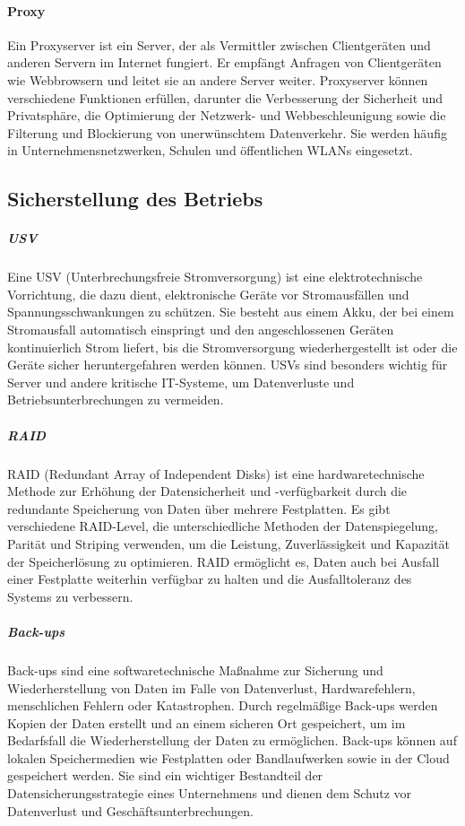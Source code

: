 \paragraph{Proxy}

Ein Proxyserver ist ein Server, der als Vermittler zwischen Clientgeräten und anderen Servern im Internet fungiert. Er empfängt Anfragen von Clientgeräten wie Webbrowsern und leitet sie an andere Server weiter. Proxyserver können verschiedene Funktionen erfüllen, darunter die Verbesserung der Sicherheit und Privatsphäre, die Optimierung der Netzwerk- und Webbeschleunigung sowie die Filterung und Blockierung von unerwünschtem Datenverkehr. Sie werden häufig in Unternehmensnetzwerken, Schulen und öffentlichen WLANs eingesetzt.

\subsection{Sicherstellung des Betriebs}

\subparagraph{USV}

Eine USV (Unterbrechungsfreie Stromversorgung) ist eine elektrotechnische Vorrichtung, die dazu dient, elektronische Geräte vor Stromausfällen und Spannungsschwankungen zu schützen. Sie besteht aus einem Akku, der bei einem Stromausfall automatisch einspringt und den angeschlossenen Geräten kontinuierlich Strom liefert, bis die Stromversorgung wiederhergestellt ist oder die Geräte sicher heruntergefahren werden können. USVs sind besonders wichtig für Server und andere kritische IT-Systeme, um Datenverluste und Betriebsunterbrechungen zu vermeiden.

\subparagraph{RAID}

RAID (Redundant Array of Independent Disks) ist eine hardwaretechnische Methode zur Erhöhung der Datensicherheit und -verfügbarkeit durch die redundante Speicherung von Daten über mehrere Festplatten. Es gibt verschiedene RAID-Level, die unterschiedliche Methoden der Datenspiegelung, Parität und Striping verwenden, um die Leistung, Zuverlässigkeit und Kapazität der Speicherlösung zu optimieren. RAID ermöglicht es, Daten auch bei Ausfall einer Festplatte weiterhin verfügbar zu halten und die Ausfalltoleranz des Systems zu verbessern.

\subparagraph{Back-ups}

Back-ups sind eine softwaretechnische Maßnahme zur Sicherung und Wiederherstellung von Daten im Falle von Datenverlust, Hardwarefehlern, menschlichen Fehlern oder Katastrophen. Durch regelmäßige Back-ups werden Kopien der Daten erstellt und an einem sicheren Ort gespeichert, um im Bedarfsfall die Wiederherstellung der Daten zu ermöglichen. Back-ups können auf lokalen Speichermedien wie Festplatten oder Bandlaufwerken sowie in der Cloud gespeichert werden. Sie sind ein wichtiger Bestandteil der Datensicherungsstrategie eines Unternehmens und dienen dem Schutz vor Datenverlust und Geschäftsunterbrechungen.

